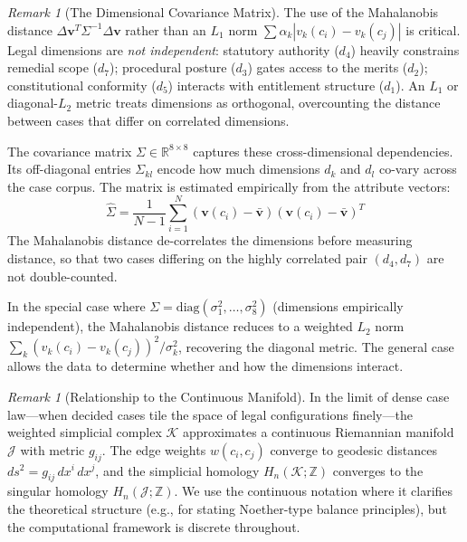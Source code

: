 \documentclass[12pt]{article}
\theoremstyle{definition}
\theoremstyle{remark}
\newtheorem{remark}[theorem]{Remark}
\newcommand{\J}{\mathcal{J}}               %
\newcommand{\R}{\mathbb{R}}
\newcommand{\Z}{\mathbb{Z}}
\begin{document}
\begin{remark}[The Dimensional Covariance Matrix]
\label{rem:covariance}
The use of the Mahalanobis distance $\Delta \mathbf{v}^T \Sigma^{-1} \Delta \mathbf{v}$ rather than an $L_1$ norm $\sum \alpha_k |v_k(c_i) - v_k(c_j)|$ is critical.  Legal dimensions are \emph{not independent}: statutory authority ($d_4$) heavily constrains remedial scope ($d_7$); procedural posture ($d_3$) gates access to the merits ($d_2$); constitutional conformity ($d_5$) interacts with entitlement structure ($d_1$).  An $L_1$ or diagonal-$L_2$ metric treats dimensions as orthogonal, overcounting the distance between cases that differ on correlated dimensions.

The covariance matrix $\Sigma \in \R^{8 \times 8}$ captures these cross-dimensional dependencies.  Its off-diagonal entries $\Sigma_{kl}$ encode how much dimensions $d_k$ and $d_l$ co-vary across the case corpus.  The matrix is estimated empirically from the attribute vectors:
\begin{equation}
\hat{\Sigma} = \frac{1}{N-1} \sum_{i=1}^{N} (\mathbf{v}(c_i) - \bar{\mathbf{v}})(\mathbf{v}(c_i) - \bar{\mathbf{v}})^T
\label{eq:covariance}
\end{equation}
The Mahalanobis distance de-correlates the dimensions before measuring distance, so that two cases differing on the highly correlated pair $(d_4, d_7)$ are not double-counted.

In the special case where $\Sigma = \text{diag}(\sigma_1^2, \ldots, \sigma_8^2)$ (dimensions empirically independent), the Mahalanobis distance reduces to a weighted $L_2$ norm $\sum_k (v_k(c_i) - v_k(c_j))^2 / \sigma_k^2$, recovering the diagonal metric.  The general case allows the data to determine whether and how the dimensions interact.
\end{remark}

\begin{remark}[Relationship to the Continuous Manifold]
\label{rem:continuum}
In the limit of dense case law---when decided cases tile the space of legal configurations finely---the weighted simplicial complex $\mathcal{K}$ approximates a continuous Riemannian manifold $\J$ with metric $g_{ij}$.  The edge weights $w(c_i, c_j)$ converge to geodesic distances $ds^2 = g_{ij}\, dx^i\, dx^j$, and the simplicial homology $H_n(\mathcal{K}; \Z)$ converges to the singular homology $H_n(\J; \Z)$.  We use the continuous notation where it clarifies the theoretical structure (e.g., for stating Noether-type balance principles), but the computational framework is discrete throughout.
\end{remark}
\end{document}

